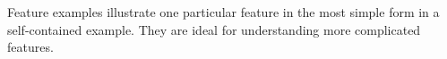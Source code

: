 Feature examples illustrate one particular feature in the most simple form in a self-\/contained example. They are ideal for understanding more complicated features. 